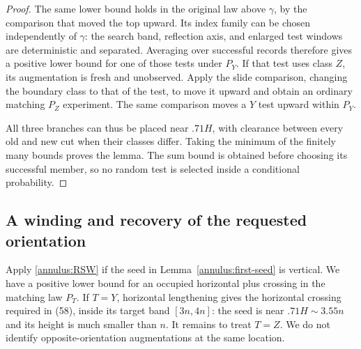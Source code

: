 \begin{proof}
The same lower bound holds in the original law above $\gamma$, by
the comparison that moved the top upward.  Its index family can be
chosen independently of $\gamma$: the search band, reflection axis,
and enlarged test windows are deterministic and separated.  Averaging
over successful records therefore gives a positive lower bound for
one of those tests under $P_Y$.  If that test uses class $Z$, its
augmentation is fresh and unobserved.  Apply the slide comparison,
changing the boundary class to that of the test, to move it upward and
obtain an ordinary matching $P_Z$ experiment.  The same comparison
moves a $Y$ test upward within $P_Y$.

All three branches can thus be placed near $.71H$, with clearance
between every old and new cut when their classes differ.  Taking the
minimum of the finitely many bounds proves the lemma.  The sum bound is
obtained before choosing its successful member, so no random test is
selected inside a conditional probability.
\end{proof}

\subsection{A winding and recovery of the requested orientation}

Apply \eqref{annulus:RSW} if the seed in
Lemma~\ref{annulus:first-seed} is vertical.  We have a positive lower
bound for an occupied horizontal plus crossing in the matching law
$P_T$.  If $T=Y$, horizontal lengthening gives the horizontal crossing
required in (58), inside its target band $[3n,4n]$: the seed is near
$.71H\sim3.55n$ and its height is much smaller than $n$.  It remains
to treat $T=Z$.  We do not identify opposite-orientation augmentations
at the same location.

